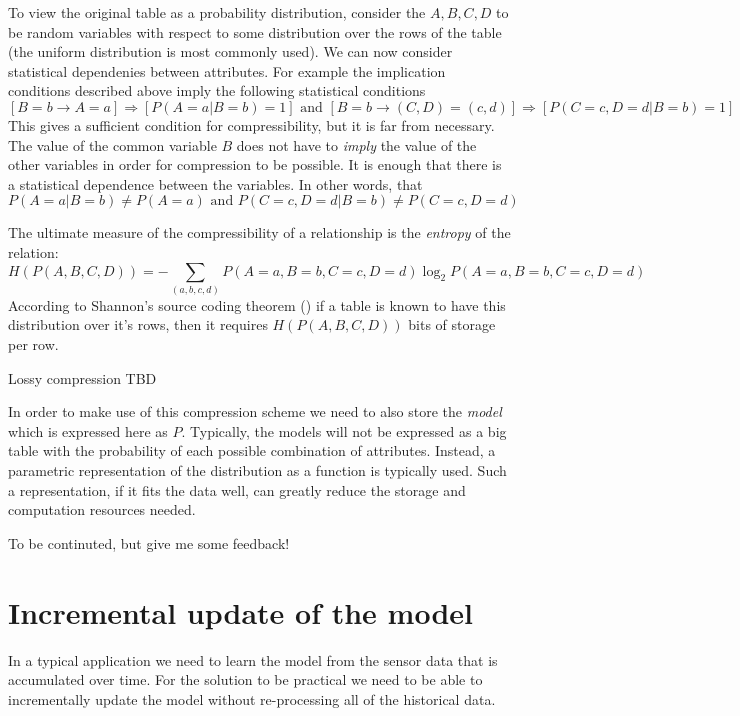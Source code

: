 To view the original table as a probability distribution, consider the
$A,B,C,D$ to be random variables with respect to some distribution
over the rows of the table (the uniform distribution is most commonly
used). We can now consider statistical dependenies between
attributes. For example the implication conditions described above
imply the following statistical conditions
\[
\left[ B=b \to A=a\right] \Rightarrow \left[ P(A=a | B=b) =1 \right]
\mbox{ and }
\left[ B=b \to (C,D)=(c,d) \right] \Rightarrow \left[ P(C=c,D=d | B=b) =1 \right]
\]
This gives a sufficient condition for compressibility, but it is far
from necessary. The value of the common variable $B$ does not have 
to {\em imply} the value of the other variables in order for
compression to be possible. It is enough that there is a statistical
dependence between the variables. In other words, that
\[
P(A=a|B=b) \neq P(A=a) \mbox{ and } P(C=c,D=d|B=b) \neq P(C=c,D=d)
\]

The ultimate measure of the compressibility of a relationship is the
{\em entropy} of the relation:
\[
H(P(A,B,C,D))= - \sum_{(a,b,c,d)} P(A=a,B=b,C=c,D=d) \log_2 P(A=a,B=b,C=c,D=d)
\]
According to Shannon's source coding theorem (\cite{}) if a table is
known to have this distribution over it's rows, then it requires
$H(P(A,B,C,D))$ bits of storage per row.

Lossy compression TBD

In order to make use of this compression scheme we need to also store
the {\em model} which is expressed here as $P$. Typically, the models
will not be expressed as a big table with the probability of each
possible combination of attributes. Instead, a parametric
representation of the distribution as a function is typically
used. Such a representation, if it fits the data well, can greatly
reduce the storage and computation resources needed.

To be continuted, but give me some feedback!

\section{Incremental update of the model}
In a typical application we need to learn the model from the sensor
data that is accumulated over time. For the solution to be practical
we need to be able to incrementally update the model without
re-processing all of the historical data.

